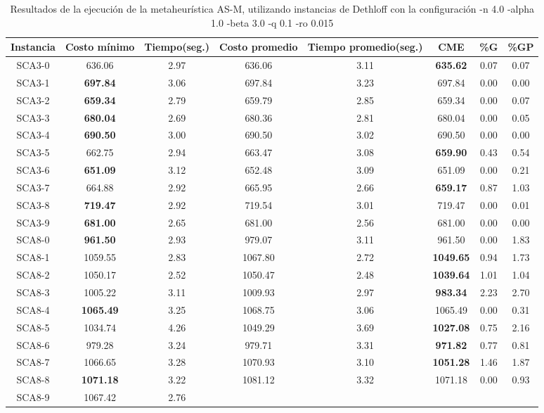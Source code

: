 \begin{table}[h]
\caption{Resultados de la ejecución de la metaheurística AS-M, utilizando instancias de Dethloff con la configuración -n 4.0 -alpha 1.0 -beta 3.0 -q 0.1 -ro 0.015}
\centering
\small
\begin{tabular}{c c c c c c c c}
\hline\hline
Instancia & Costo mínimo & Tiempo(seg.) & Costo promedio & Tiempo promedio(seg.) & CME & \%G & \%GP \\ [0.5ex]
\hline
SCA3-0 & 636.06 & 2.97 & 
636.06 & 3.11 & \bf{635.62} & 
0.07 & 0.07\\SCA3-1 & \bf{697.84} & 3.06 & 
697.84 & 3.23 & 697.84 & 0.00
 & 0.00\\
SCA3-2 & \bf{659.34} & 2.79 & 
659.79 & 2.85 & 659.34 & 0.00
 & 0.07\\SCA3-3 & \bf{680.04} & 2.69 & 
680.36 & 2.81 & 680.04 & 0.00
 & 0.05\\SCA3-4 & \bf{690.50} & 3.00 & 
690.50 & 3.02 & 690.50 & 0.00
 & 0.00\\
SCA3-5 & 662.75 & 2.94 & 
663.47 & 3.08 & \bf{659.90} & 
0.43 & 0.54\\SCA3-6 & \bf{651.09} & 3.12 & 
652.48 & 3.09 & 651.09 & 0.00
 & 0.21\\SCA3-7 & 664.88 & 2.92 & 
665.95 & 2.66 & \bf{659.17} & 
0.87 & 1.03\\SCA3-8 & \bf{719.47} & 2.92 & 
719.54 & 3.01 & 719.47 & 0.00
 & 0.01\\SCA3-9 & \bf{681.00} & 2.65 & 
681.00 & 2.56 & 681.00 & 0.00
 & 0.00\\
SCA8-0 & \bf{961.50} & 2.93 & 
979.07 & 3.11 & 961.50 & 0.00
 & 1.83\\SCA8-1 & 1059.55 & 2.83 & 
1067.80 & 2.72 & \bf{1049.65} & 
0.94 & 1.73\\SCA8-2 & 1050.17 & 2.52 & 
1050.47 & 2.48 & \bf{1039.64} & 
1.01 & 1.04\\SCA8-3 & 1005.22 & 3.11 & 
1009.93 & 2.97 & \bf{983.34} & 
2.23 & 2.70\\SCA8-4 & \bf{1065.49} & 3.25 & 
1068.75 & 3.06 & 1065.49 & 0.00
 & 0.31\\SCA8-5 & 1034.74 & 4.26 & 
1049.29 & 3.69 & \bf{1027.08} & 
0.75 & 2.16\\SCA8-6 & 979.28 & 3.24 & 
979.71 & 3.31 & \bf{971.82} & 
0.77 & 0.81\\SCA8-7 & 1066.65 & 3.28 & 
1070.93 & 3.10 & \bf{1051.28} & 
1.46 & 1.87\\SCA8-8 & \bf{1071.18} & 3.22 & 
1081.12 & 3.32 & 1071.18 & 0.00
 & 0.93\\SCA8-9 & 1067.42 & 2.76 & 

\end{tabular}
\end{table}
